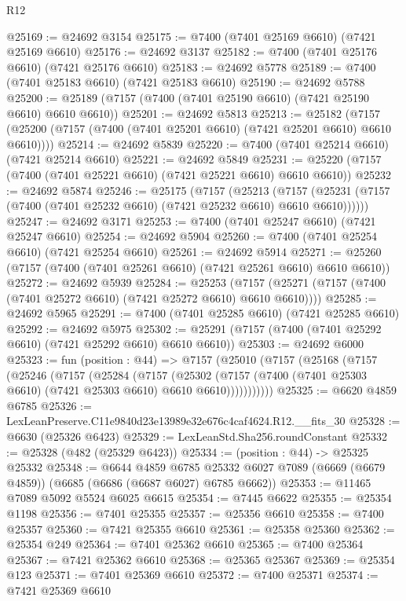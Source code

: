 \begin{lexlean}{R12}
\begin{coremodule}
@25169 := @24692 @3154
@25175 := @7400 (@7401 @25169 @6610) (@7421 @25169 @6610)
@25176 := @24692 @3137
@25182 := @7400 (@7401 @25176 @6610) (@7421 @25176 @6610)
@25183 := @24692 @5778
@25189 := @7400 (@7401 @25183 @6610) (@7421 @25183 @6610)
@25190 := @24692 @5788
@25200 := @25189 (@7157 (@7400 (@7401 @25190 @6610) (@7421 @25190 @6610) @6610 @6610))
@25201 := @24692 @5813
@25213 := @25182
    (@7157 (@25200 (@7157 (@7400 (@7401 @25201 @6610) (@7421 @25201 @6610) @6610 @6610))))
@25214 := @24692 @5839
@25220 := @7400 (@7401 @25214 @6610) (@7421 @25214 @6610)
@25221 := @24692 @5849
@25231 := @25220 (@7157 (@7400 (@7401 @25221 @6610) (@7421 @25221 @6610) @6610 @6610))
@25232 := @24692 @5874
@25246 := @25175
    (@7157
      (@25213
        (@7157 (@25231 (@7157 (@7400 (@7401 @25232 @6610) (@7421 @25232 @6610) @6610 @6610))))))
@25247 := @24692 @3171
@25253 := @7400 (@7401 @25247 @6610) (@7421 @25247 @6610)
@25254 := @24692 @5904
@25260 := @7400 (@7401 @25254 @6610) (@7421 @25254 @6610)
@25261 := @24692 @5914
@25271 := @25260 (@7157 (@7400 (@7401 @25261 @6610) (@7421 @25261 @6610) @6610 @6610))
@25272 := @24692 @5939
@25284 := @25253
    (@7157 (@25271 (@7157 (@7400 (@7401 @25272 @6610) (@7421 @25272 @6610) @6610 @6610))))
@25285 := @24692 @5965
@25291 := @7400 (@7401 @25285 @6610) (@7421 @25285 @6610)
@25292 := @24692 @5975
@25302 := @25291 (@7157 (@7400 (@7401 @25292 @6610) (@7421 @25292 @6610) @6610 @6610))
@25303 := @24692 @6000
@25323 := fun (position : @44) =>
  @7157
    (@25010
      (@7157
        (@25168
          (@7157
            (@25246
              (@7157
                (@25284
                  (@7157
                    (@25302
                      (@7157 (@7400 (@7401 @25303 @6610) (@7421 @25303 @6610) @6610 @6610)))))))))))
@25325 := @6620 @4859 @6785
@25326 := LexLeanPreserve.C11e9840d23e13989e32e676c4caf4624.R12.__fits_30
@25328 := @6630 (@25326 @6423)
@25329 := LexLeanStd.Sha256.roundConstant
@25332 := @25328 (@482 (@25329 @6423))
@25334 := (position : @44) -> @25325 @25332
@25348 := @6644
    @4859
    @6785
    @25332
    @6027
    @7089
    (@6669 (@6679 @4859))
    (@6685 (@6686 (@6687 @6027) @6785 @6662))
@25353 := @11465 @7089 @5092 @5524 @6025 @6615
@25354 := @7445 @6622
@25355 := @25354 @1198
@25356 := @7401 @25355
@25357 := @25356 @6610
@25358 := @7400 @25357
@25360 := @7421 @25355 @6610
@25361 := @25358 @25360
@25362 := @25354 @249
@25364 := @7401 @25362 @6610
@25365 := @7400 @25364
@25367 := @7421 @25362 @6610
@25368 := @25365 @25367
@25369 := @25354 @123
@25371 := @7401 @25369 @6610
@25372 := @7400 @25371
@25374 := @7421 @25369 @6610

\end{coremodule}
\end{lexlean}
